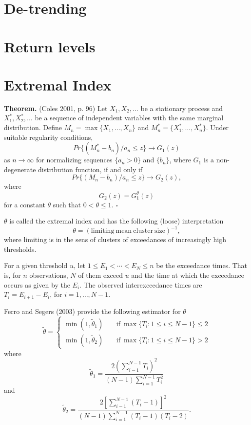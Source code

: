 \documentclass[12pt]{article}
\begin{document}
\section{De-trending}



\section{Return levels}



\section{Extremal Index}

\textbf{Theorem.} (Coles 2001, p. 96) Let $X_1,X_2,\ldots$ be a stationary process and $X_1^*,X_2^*,\ldots$ be a sequence of independent variables with the same marginal distribution. Define $M_n=\max\{X_1,\ldots,X_n\}$ and $M_n^*=\{X_1^*,\ldots,X_n^*\}$. Under suitable regularity conditions,
\[ Pr\{(M_n^*-b_n)/a_n\leq z\} \rightarrow G_1(z) \]
as $n\rightarrow\infty$ for normalizing sequences $\{a_n > 0\}$ and $\{b_n\}$, where $G_1$ is a non-degenerate distribution function, if and only if
\[ Pr\{(M_n-b_n)/a_n\leq z\} \rightarrow G_2(z), \]
where
\[ G_2(z)=G_1^\theta(z) \]
for a constant $\theta$ such that $0<\theta\leq 1$. \hfill $\square$
\bigskip

$\theta$ is called the extremal index and has the following (loose) interpretation
\[ \theta = (\mathrm{limiting~mean~cluster~size})^{-1}, \]
where limiting is in the sens of clusters of exceedances of increasingly high thresholds.
\bigskip

For a given threshold $u$, let $1\leq E_1 < \cdots < E_N \leq n$ be the exceedance times. That is, for $n$ observations, $N$ of them exceed $u$ and the time at which the exceedance occurs as given by the $E_i$. The observed interexceedance times are $T_i=E_{i+1}-E_i$, for $i=1,\ldots,N-1$.
\bigskip

Ferro and Segers (2003) provide the following estimator for $\theta$
\[ \widetilde{\theta}=\begin{cases} \min(1, \tilde{\theta}_1) & \mathrm{~~~~~if~} \max\{T_i: 1\leq i \leq N-1\} \leq 2  \\ \min(1, \tilde{\theta}_2) & \mathrm{~~~~~if~} \max\{T_i:1\leq i \leq N-1\} > 2 \end{cases} \]
where
\[ \tilde{\theta}_1 = \frac{2\left(\sum_{i-1}^{N-1}T_i\right)^2}{(N-1)\sum_{i=1}^{N-1}T_i^2} \]
and
\[ \tilde{\theta}_2 = \frac{2\left[\sum_{i-1}^{N-1}(T_i-1)\right]^2}{(N-1)\sum_{i=1}^{N-1}(T_i-1)(T_i-2)}. \]
\bigskip
\end{document}
